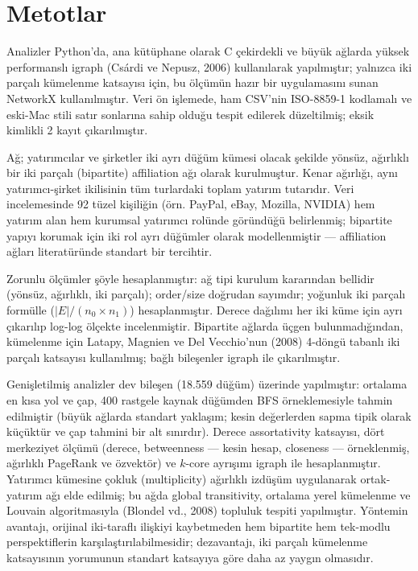 \documentclass[12pt,a4paper]{article}
\begin{document}
\section{Metotlar}

Analizler Python'da, ana kütüphane olarak C çekirdekli ve büyük ağlarda yüksek performanslı igraph (Csárdi ve Nepusz, 2006) kullanılarak yapılmıştır; yalnızca iki parçalı kümelenme katsayısı için, bu ölçümün hazır bir uygulamasını sunan NetworkX kullanılmıştır. Veri ön işlemede, ham CSV'nin ISO-8859-1 kodlamalı ve eski-Mac stili satır sonlarına sahip olduğu tespit edilerek düzeltilmiş; eksik kimlikli 2 kayıt çıkarılmıştır.

Ağ; yatırımcılar ve şirketler iki ayrı düğüm kümesi olacak şekilde yönsüz, ağırlıklı bir iki parçalı (bipartite) affiliation ağı olarak kurulmuştur. Kenar ağırlığı, aynı yatırımcı-şirket ikilisinin tüm turlardaki toplam yatırım tutarıdır. Veri incelemesinde 92 tüzel kişiliğin (örn. PayPal, eBay, Mozilla, NVIDIA) hem yatırım alan hem kurumsal yatırımcı rolünde göründüğü belirlenmiş; bipartite yapıyı korumak için iki rol ayrı düğümler olarak modellenmiştir --- affiliation ağları literatüründe standart bir tercihtir.

Zorunlu ölçümler şöyle hesaplanmıştır: ağ tipi kurulum kararından bellidir (yönsüz, ağırlıklı, iki parçalı); order/size doğrudan sayımdır; yoğunluk iki parçalı formülle ($|E|/(n_0 \times n_1)$) hesaplanmıştır. Derece dağılımı her iki küme için ayrı çıkarılıp log-log ölçekte incelenmiştir. Bipartite ağlarda üçgen bulunmadığından, kümelenme için Latapy, Magnien ve Del Vecchio'nun (2008) 4-döngü tabanlı iki parçalı katsayısı kullanılmış; bağlı bileşenler igraph ile çıkarılmıştır.

Genişletilmiş analizler dev bileşen (18.559 düğüm) üzerinde yapılmıştır: ortalama en kısa yol ve çap, 400 rastgele kaynak düğümden BFS örneklemesiyle tahmin edilmiştir (büyük ağlarda standart yaklaşım; kesin değerlerden sapma tipik olarak küçüktür ve çap tahmini bir alt sınırdır). Derece assortativity katsayısı, dört merkeziyet ölçümü (derece, betweenness --- kesin hesap, closeness --- örneklenmiş, ağırlıklı PageRank ve özvektör) ve $k$-core ayrışımı igraph ile hesaplanmıştır. Yatırımcı kümesine çokluk (multiplicity) ağırlıklı izdüşüm uygulanarak ortak-yatırım ağı elde edilmiş; bu ağda global transitivity, ortalama yerel kümelenme ve Louvain algoritmasıyla (Blondel vd., 2008) topluluk tespiti yapılmıştır. Yöntemin avantajı, orijinal iki-taraflı ilişkiyi kaybetmeden hem bipartite hem tek-modlu perspektiflerin karşılaştırılabilmesidir; dezavantajı, iki parçalı kümelenme katsayısının yorumunun standart katsayıya göre daha az yaygın olmasıdır.
\end{document}
